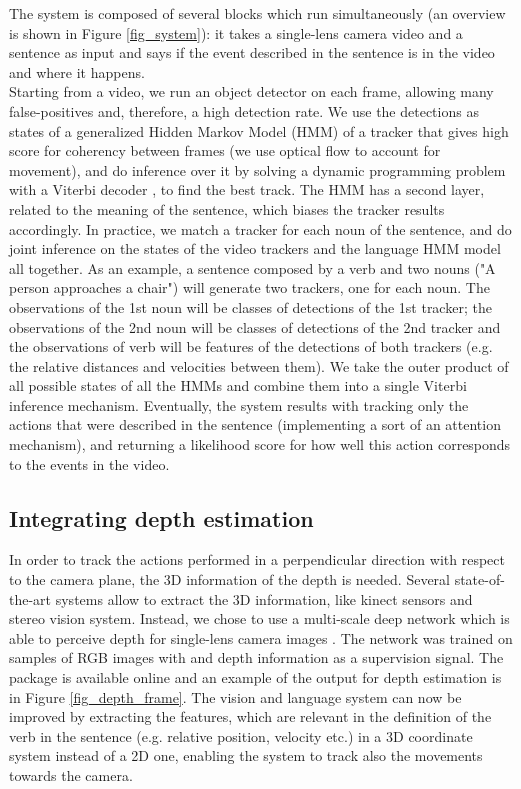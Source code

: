 \documentclass[10pt,twocolumn,letterpaper]{article}
\begin{document}
The system is composed of several blocks which run simultaneously (an overview is shown in Figure \ref{fig_system}): it takes a single-lens camera video and a sentence as input and says if the event described in the sentence is in the video and where it happens.\\
Starting from a video, we run an object detector on each frame, allowing many false-positives and, therefore, a high detection rate. We use the detections as states of a generalized Hidden Markov Model (HMM) of a tracker that gives high score for coherency between frames (we use optical flow to account for movement), and do inference over it by solving a dynamic programming problem with a Viterbi decoder \cite{viterbi}, to find the best track.
The HMM has a second layer, related to the meaning of the sentence, which biases the tracker results accordingly. In practice, we match a tracker for each noun of the sentence, and do joint inference on the states of the video trackers and the language HMM model all together. As an example, a sentence composed by a verb and two nouns ("A person approaches a chair") will generate two trackers, one for each noun. The observations of the 1st noun will be classes of detections of the 1st tracker; the observations of the 2nd noun will be classes of detections of the 2nd tracker and the observations of verb will be features of the detections of both trackers (e.g. the relative distances and velocities between them).
We take the outer product of all possible states of all the HMMs and combine them into a single Viterbi inference mechanism. Eventually, the system results with tracking only the actions that were described in the sentence (implementing a sort of an attention mechanism), and returning a likelihood score for how well this action corresponds to the events in the video. 

\subsection{Integrating depth estimation}
In order to track the actions performed in a perpendicular direction with respect to the camera plane, the 3D information of the depth is needed.
Several state-of-the-art systems allow to extract the 3D information, like kinect sensors and stereo vision system. Instead, we chose to use a multi-scale deep network which is able to perceive depth for single-lens camera images \cite{depthfayao}. The network was trained on samples of RGB images with and depth information as a supervision signal. The package is available online \cite{depthfayao} and an example of the output for depth estimation is in Figure \ref{fig_depth_frame}.
The vision and language system can now be improved by extracting the features, which are relevant in the definition of the verb in the sentence (e.g. relative position, velocity etc.) in a 3D coordinate system instead of a 2D one, enabling the system to track also the movements towards the camera.
\end{document}
